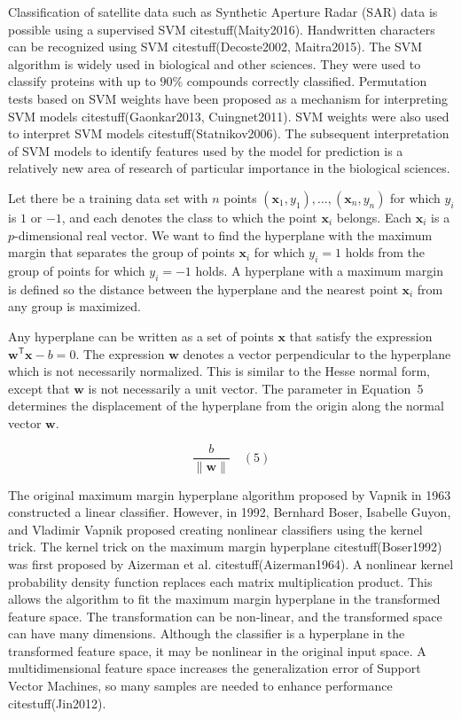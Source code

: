 \documentclass[preprint,12pt]{elsarticle}
\begin{document}
Classification of satellite data such as Synthetic Aperture Radar (SAR) data is possible using a supervised SVM citestuff(Maity2016). Handwritten characters can be recognized using SVM citestuff(Decoste2002, Maitra2015). The SVM algorithm is widely used in biological and other sciences. They were used to classify proteins with up to $90\%$ compounds correctly classified. Permutation tests based on SVM weights have been proposed as a mechanism for interpreting SVM models citestuff(Gaonkar2013, Cuingnet2011). SVM weights were also used to interpret SVM models citestuff(Statnikov2006). The subsequent interpretation of SVM models to identify features used by the model for prediction is a relatively new area of research of particular importance in the biological sciences.

Let there be a training data set with $n$ points $(\mathbf{x}_{1},y_{1}),\ldots,(\mathbf{x}_{n},y_{n})$ for which $y_{i}$ is $1$ or $-1$, and each denotes the class to which the point $\mathbf{x}_{i}$ belongs. Each $\mathbf{x}_{i}$ is a $p$-dimensional real vector. We want to find the hyperplane with the maximum margin that separates the group of points $\mathbf{x}_{i}$ for which $y_{i}=1$ holds from the group of points for which $y_{i}=-1$ holds. A hyperplane with a maximum margin is defined so the distance between the hyperplane and the nearest point $\mathbf{x}_{i}$ from any group is maximized.

Any hyperplane can be written as a set of points $\mathbf{x}$ that satisfy the expression $\mathbf{w}^{\mathsf{T}}\mathbf{x} -b=0$. The expression $\mathbf{w}$ denotes a vector perpendicular to the hyperplane which is not necessarily normalized. This is similar to the Hesse normal form, except that $\mathbf{w}$ is not necessarily a unit vector. The parameter in Equation~5 determines the displacement of the hyperplane from the origin along the normal vector $\mathbf{w}$.

\begin{equation}
	\frac{b}{\|\mathbf{w} \|}
	\quad\left(5\right)
\end{equation}

The original maximum margin hyperplane algorithm proposed by Vapnik in 1963 constructed a linear classifier. However, in 1992, Bernhard Boser, Isabelle Guyon, and Vladimir Vapnik proposed creating nonlinear classifiers using the kernel trick. The kernel trick on the maximum margin hyperplane citestuff(Boser1992) was first proposed by Aizerman et al. citestuff(Aizerman1964). A nonlinear kernel probability density function replaces each matrix multiplication product. This allows the algorithm to fit the maximum margin hyperplane in the transformed feature space. The transformation can be non-linear, and the transformed space can have many dimensions. Although the classifier is a hyperplane in the transformed feature space, it may be nonlinear in the original input space. A multidimensional feature space increases the generalization error of Support Vector Machines, so many samples are needed to enhance performance citestuff(Jin2012). 
\end{document}
